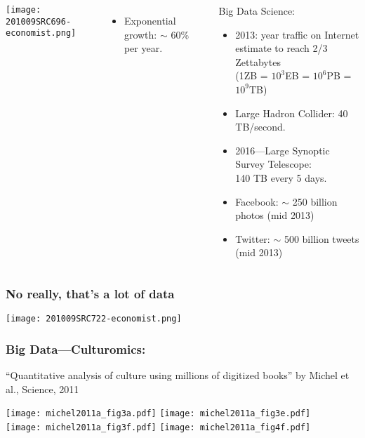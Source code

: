 \begin{frame}


  \begin{columns}
    \texttt{[image: 201009SRC696-economist.png]}
    \begin{itemize}
    \item 
      Exponential growth: $\sim$ 60\% per year.
    \end{itemize}
    \begin{block}{Big Data Science:}
    \begin{itemize}
    \item 
      2013: year traffic on Internet estimate to reach 2/3 Zettabytes \\
      (1ZB = $10^3$EB = $10^6$PB = $10^9$TB)
    \item 
      Large Hadron Collider: 40 TB/second.\\
    \item 
      2016---Large Synoptic Survey Telescope:\\
      140 TB every 5 days.
    \item 
      Facebook: $\sim$ 250 billion photos (mid 2013)
    \item 
      Twitter: $\sim$ 500 billion tweets (mid 2013)
    \end{itemize}
    \end{block}      
  \end{columns}

\end{frame}

\begin{frame}[plain]
  \frametitle{No really, that's a lot of data}

  \texttt{[image: 201009SRC722-economist.png]}
\end{frame}


\begin{frame}
  \frametitle{Big Data---Culturomics:}

  \small{``Quantitative analysis of culture using millions of
    digitized books'' by Michel et al., Science, 2011\cite{michel2011a}}

  \texttt{[image: michel2011a\_fig3a.pdf]} 
  \texttt{[image: michel2011a\_fig3e.pdf]} \\
  \texttt{[image: michel2011a\_fig3f.pdf]}
  \texttt{[image: michel2011a\_fig4f.pdf]}

  {\small
    \\
  }

\end{frame}


